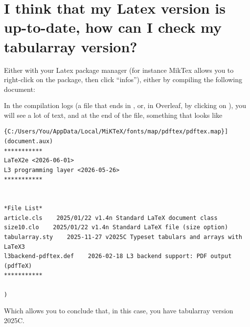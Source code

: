 \section{I think that my Latex version is up-to-date, how can I check my tabularray version?}

Either with your Latex package manager (for instance MikTex allows you to right-click on the package, then click ``infos''), either by compiling the following document:


In the compilation logs (a file that ends in , or, in Overleaf, by clicking on ), you will see a lot of text, and at the end of the file, something that looks like 

\begin{verbatim}
{C:/Users/You/AppData/Local/MiKTeX/fonts/map/pdftex/pdftex.map}] (document.aux)
***********
LaTeX2e <2026-06-01>
L3 programming layer <2026-05-26>
***********


*File List*
article.cls    2025/01/22 v1.4n Standard LaTeX document class
size10.clo    2025/01/22 v1.4n Standard LaTeX file (size option)
tabularray.sty    2025-11-27 v2025C Typeset tabulars and arrays with LaTeX3
l3backend-pdftex.def    2026-02-18 L3 backend support: PDF output (pdfTeX)
***********

)
\end{verbatim}

Which allows you to conclude that, in this case, you have tabularray version 2025C.